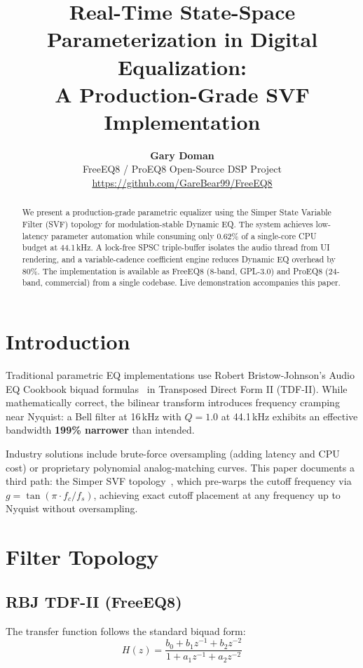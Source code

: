 \documentclass[twocolumn]{article}
\title{Real-Time State-Space Parameterization in Digital Equalization:\\A Production-Grade SVF Implementation}
\author{%
  \textbf{Gary Doman}\\
  FreeEQ8 / ProEQ8 Open-Source DSP Project\\
  \url{https://github.com/GareBear99/FreeEQ8}
}
\date{}
\makeatletter
\renewcommand{\maketitle}{%
  \twocolumn[%
    \begin{center}
      {\Large\bfseries\MakeUppercase{\@title}\par}
      \vspace{1em}
      {\normalsize\@author\par}
      \vspace{1.5em}
    \end{center}
  ]%
}
\makeatother
\begin{document}
\maketitle

\begin{abstract}
We present a production-grade parametric equalizer using the Simper State Variable Filter (SVF) topology for modulation-stable Dynamic EQ. The system achieves low-latency parameter automation while consuming only 0.62\% of a single-core CPU budget at 44.1\,kHz. A lock-free SPSC triple-buffer isolates the audio thread from UI rendering, and a variable-cadence coefficient engine reduces Dynamic EQ overhead by 80\%. The implementation is available as FreeEQ8 (8-band, GPL-3.0) and ProEQ8 (24-band, commercial) from a single codebase. Live demonstration accompanies this paper.
\end{abstract}

\section{Introduction}

Traditional parametric EQ implementations use Robert Bristow-Johnson's Audio EQ Cookbook biquad formulas~\cite{rbj} in Transposed Direct Form II (TDF-II). While mathematically correct, the bilinear transform introduces frequency cramping near Nyquist: a Bell filter at 16\,kHz with $Q=1.0$ at 44.1\,kHz exhibits an effective bandwidth \textbf{199\% narrower} than intended.

Industry solutions include brute-force oversampling (adding latency and CPU cost) or proprietary polynomial analog-matching curves. This paper documents a third path: the Simper SVF topology~\cite{simper}, which pre-warps the cutoff frequency via $g = \tan(\pi \cdot f_c / f_s)$, achieving exact cutoff placement at any frequency up to Nyquist without oversampling.

\section{Filter Topology}

\subsection{RBJ TDF-II (FreeEQ8)}

The transfer function follows the standard biquad form:
\begin{equation}
H(z) = \frac{b_0 + b_1 z^{-1} + b_2 z^{-2}}{1 + a_1 z^{-1} + a_2 z^{-2}}
\end{equation}
\end{document}
